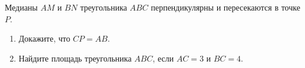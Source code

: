 \begin{ex}
	\begin{condition}
		Медианы \( AM  \) и \( BN  \) треугольника \( ABC  \) перпендикулярны и	пересекаются в точке \( P \).
		\begin{enumerate}
			\item Докажите, что \( CP = AB \).
			\item Найдите площадь треугольника \( ABC \), если \( AC=3  \) и \( BC=4 \).
		\end{enumerate}
	\end{condition}
\end{ex}